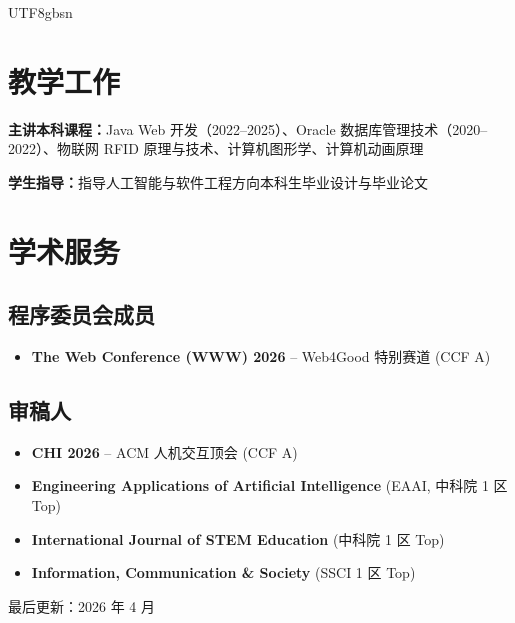 \documentclass[a4paper,10pt]{article}
\begin{document}
\begin{CJK*}{UTF8}{gbsn}
\section*{教学工作}

\noindent
\textbf{主讲本科课程：}Java Web 开发（2022--2025）、Oracle 数据库管理技术（2020--2022）、物联网 RFID 原理与技术、计算机图形学、计算机动画原理

\noindent
\textbf{学生指导：}指导人工智能与软件工程方向本科生毕业设计与毕业论文

\section*{学术服务}

\subsection*{程序委员会成员}
\begin{itemize}[leftmargin=*]
    \item \textbf{The Web Conference (WWW) 2026} -- Web4Good 特别赛道 (CCF A)
\end{itemize}

\subsection*{审稿人}
\begin{itemize}[leftmargin=*]
    \item \textbf{CHI 2026} -- ACM 人机交互顶会 (CCF A)
    \item \textbf{Engineering Applications of Artificial Intelligence} (EAAI, 中科院 1 区 Top)
    \item \textbf{International Journal of STEM Education} (中科院 1 区 Top)
    \item \textbf{Information, Communication \& Society} (SSCI 1 区 Top)
\end{itemize}


\vfill
\begin{center}
    \small 最后更新：2026 年 4 月
\end{center}

\ifPDFTeX
\end{CJK*}
\fi
\end{document}
